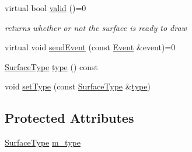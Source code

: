 \begin{DoxyCompactItemize}
virtual bool \hyperlink{classmotorcar_1_1WaylandSurface_af2f54076ec690f4d478771183c9b0db5}{valid} ()=0
\begin{DoxyCompactList}\small\item\em returns whether or not the surface is ready to draw \end{DoxyCompactList}\item 
virtual void \hyperlink{classmotorcar_1_1WaylandSurface_a8d709e7d02ee7f7b8b3343590e518993}{send\-Event} (const \hyperlink{classmotorcar_1_1Event}{Event} \&event)=0
\item 
\hyperlink{classmotorcar_1_1WaylandSurface_a7715a41b6776800656722407ec01e0a5}{Surface\-Type} \hyperlink{classmotorcar_1_1WaylandSurface_a0e6e5e2455666f607a8ddb2479ba8e88}{type} () const 
\item 
void \hyperlink{classmotorcar_1_1WaylandSurface_a8806b03b3c4007578f26c1b907303336}{set\-Type} (const \hyperlink{classmotorcar_1_1WaylandSurface_a7715a41b6776800656722407ec01e0a5}{Surface\-Type} \&\hyperlink{classmotorcar_1_1WaylandSurface_a0e6e5e2455666f607a8ddb2479ba8e88}{type})
\end{DoxyCompactItemize}
\subsection*{Protected Attributes}
\begin{DoxyCompactItemize}
\item 
\hyperlink{classmotorcar_1_1WaylandSurface_a7715a41b6776800656722407ec01e0a5}{Surface\-Type} \hyperlink{classmotorcar_1_1WaylandSurface_a73fc5c245e98a08a551c7f412fd95966}{m\-\_\-type}
\end{DoxyCompactItemize}


